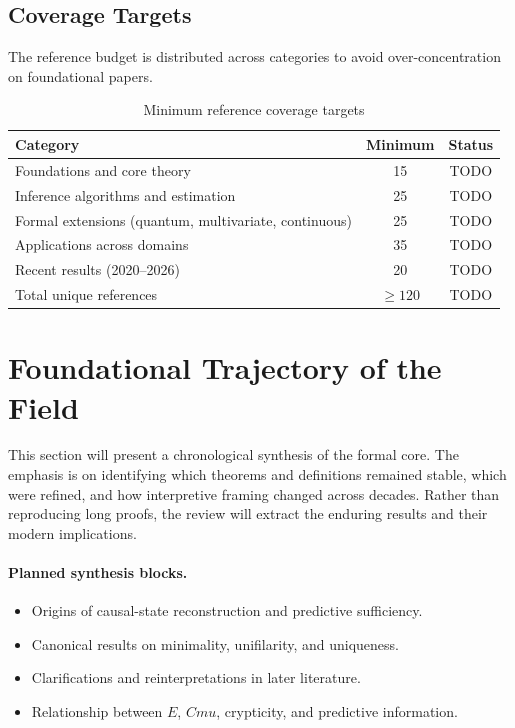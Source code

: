 \documentclass[11pt,twocolumn]{article}
\newcommand{\Cmu}{C_\mu}
\newcommand{\TargetRefs}{120}
\def\Cmu{Cmu}%
\begin{document}
\subsection{Coverage Targets}

The reference budget is distributed across categories to avoid over-concentration on foundational papers.

\begin{table}[h]
\centering
\caption{Minimum reference coverage targets}
\label{tab:ref-targets}
\small
\begin{tabular}{lcc}
\toprule
Category & Minimum & Status \\
\midrule
Foundations and core theory & 15 & TODO \\
Inference algorithms and estimation & 25 & TODO \\
Formal extensions (quantum, multivariate, continuous) & 25 & TODO \\
Applications across domains & 35 & TODO \\
Recent results (2020--2026) & 20 & TODO \\
\midrule
Total unique references & $\geq \TargetRefs$ & TODO \\
\bottomrule
\end{tabular}
\end{table}

\section{Foundational Trajectory of the Field}
\label{sec:foundations}

This section will present a chronological synthesis of the formal core.
The emphasis is on identifying which theorems and definitions remained stable, which were refined, and how interpretive framing changed across decades.
Rather than reproducing long proofs, the review will extract the enduring results and their modern implications.

\paragraph{Planned synthesis blocks.}
\begin{itemize}[nosep]
    \item Origins of causal-state reconstruction and predictive sufficiency.
    \item Canonical results on minimality, unifilarity, and uniqueness.
    \item Clarifications and reinterpretations in later literature.
    \item Relationship between $E$, $\Cmu$, crypticity, and predictive information.
\end{itemize}
\end{document}
